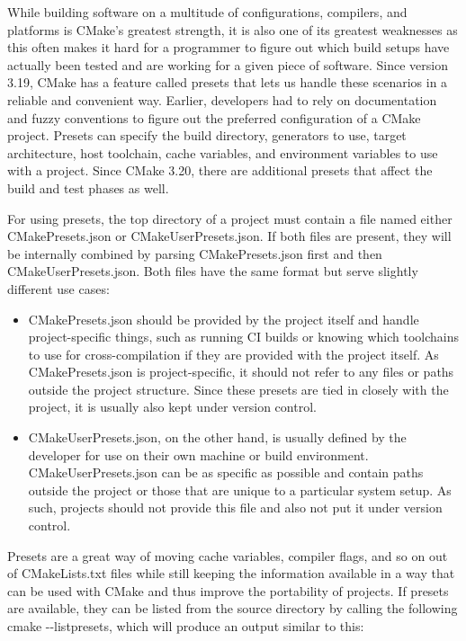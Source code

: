 While building software on a multitude of configurations, compilers, and platforms is CMake's greatest strength, it is also one of its greatest weaknesses as this often makes it hard for a programmer to figure out which build setups have actually been tested and are working for a given piece of software. Since version 3.19, CMake has a feature called presets that lets us handle these scenarios in a reliable and convenient way. Earlier, developers had to rely on documentation and fuzzy conventions to figure out the preferred configuration of a CMake project. Presets can specify the build directory, generators to use, target architecture, host toolchain, cache variables, and environment variables to use with a project. Since CMake 3.20, there are additional presets that affect the build and test phases as well.

For using presets, the top directory of a project must contain a file named either CMakePresets.json or CMakeUserPresets.json. If both files are present, they will be internally combined by parsing CMakePresets.json first and then  CMakeUserPresets.json. Both files have the same format but serve slightly different use cases:

\begin{itemize}
\item 
CMakePresets.json should be provided by the project itself and handle project-specific things, such as running CI builds or knowing which toolchains to use for cross-compilation if they are provided with the project itself. As CMakePresets.json is project-specific, it should not refer to any files or paths outside the project structure. Since these presets are tied in closely with the project, it is usually also kept under version control.

\item 
CMakeUserPresets.json, on the other hand, is usually defined by the developer for use on their own machine or build environment. CMakeUserPresets.json can be as specific as possible and contain paths outside the project or those that are unique to a particular system setup. As such, projects should not provide this file and also not put it under version control.
\end{itemize}

Presets are a great way of moving cache variables, compiler flags, and so on out of CMakeLists.txt files while still keeping the information available in a way that can be used with CMake and thus improve the portability of projects. If presets are available, they can be listed from the source directory by calling the following cmake -{}-listpresets, which will produce an output similar to this:

